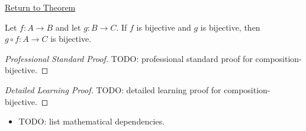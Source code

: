 \newpage
{}
\label{prf:composition-bijective}

\begin{remark*}[Return]
\hyperref[cor:composition-bijective]{Return to Theorem}
\end{remark*}

\begin{corollary*}
Let $f:A\to B$ and let $g:B\to C$. If $f$ is bijective and $g$ is
bijective, then $g\circ f:A\to C$ is bijective.

\smallskip\noindent
\end{corollary*}

\begin{proof}[Professional Standard Proof]
\LRAProofBodyStart
TODO: professional standard proof for composition-bijective.
\end{proof}

\begin{proof}[Detailed Learning Proof]
\LRAProofBodyStart
TODO: detailed learning proof for composition-bijective.
\end{proof}

\begin{remark*}
\end{remark*}

\begin{dependencies}
\begin{itemize}
  \item TODO: list mathematical dependencies.
\end{itemize}
\end{dependencies}

\clearpage
